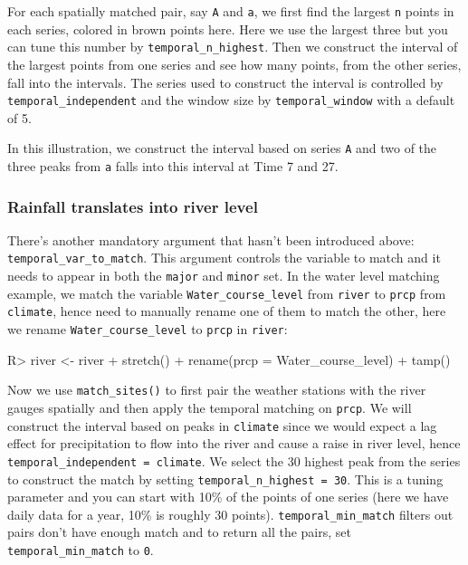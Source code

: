 \documentclass[
]{jss}
\begin{document}
For each spatially matched pair, say \texttt{A} and \texttt{a}, we first
find the largest \texttt{n} points in each series, colored in brown
points here. Here we use the largest three but you can tune this number
by \texttt{temporal\_n\_highest}. Then we construct the interval of the
largest points from one series and see how many points, from the other
series, fall into the intervals. The series used to construct the
interval is controlled by \texttt{temporal\_independent} and the window
size by \texttt{temporal\_window} with a default of 5.

In this illustration, we construct the interval based on series
\texttt{A} and two of the three peaks from \texttt{a} falls into this
interval at Time 7 and 27.

\hypertarget{rainfall-translates-into-river-level}{%
\subsubsection{Rainfall translates into river
level}\label{rainfall-translates-into-river-level}}

There's another mandatory argument that hasn't been introduced above:
\texttt{temporal\_var\_to\_match}. This argument controls the variable
to match and it needs to appear in both the \texttt{major} and
\texttt{minor} set. In the water level matching example, we match the
variable \texttt{Water\_course\_level} from \texttt{river} to
\texttt{prcp} from \texttt{climate}, hence need to manually rename one
of them to match the other, here we rename \texttt{Water\_course\_level}
to \texttt{prcp} in \texttt{river}:

\begin{CodeChunk}
\begin{CodeInput}
R> river <- river %
+   stretch() %
+   rename(prcp = Water_course_level) %
+   tamp()
\end{CodeInput}
\end{CodeChunk}

Now we use \texttt{match\_sites()} to first pair the weather stations
with the river gauges spatially and then apply the temporal matching on
\texttt{prcp}. We will construct the interval based on peaks in
\texttt{climate} since we would expect a lag effect for precipitation to
flow into the river and cause a raise in river level, hence
\texttt{temporal\_independent\ =\ climate}. We select the 30 highest
peak from the series to construct the match by setting
\texttt{temporal\_n\_highest\ =\ 30}. This is a tuning parameter and you
can start with 10\% of the points of one series (here we have daily data
for a year, 10\% is roughly 30 points). \texttt{temporal\_min\_match}
filters out pairs don't have enough match and to return all the pairs,
set \texttt{temporal\_min\_match} to \texttt{0}.
\end{document}

